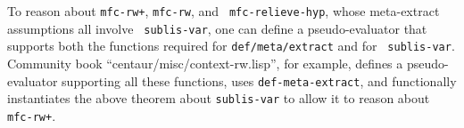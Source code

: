 To reason about {\tt mfc-rw+}, {\tt mfc-rw}, and {\tt
  mfc-relieve-hyp}, whose meta-extract assumptions all involve {\tt
  sublis-var}, one can define a pseudo-evaluator that supports both
the functions required for \texttt{def\-/meta\-/extract} and for {\tt
  sublis-var}.  Community book ``centaur/misc/context-rw.lisp'', for
example, defines a pseudo-evaluator supporting all these functions,
uses {\tt def-meta-extract}, and functionally instantiates the above
theorem about {\tt sublis-var} to allow it to reason about {\tt
  mfc-rw+}.






